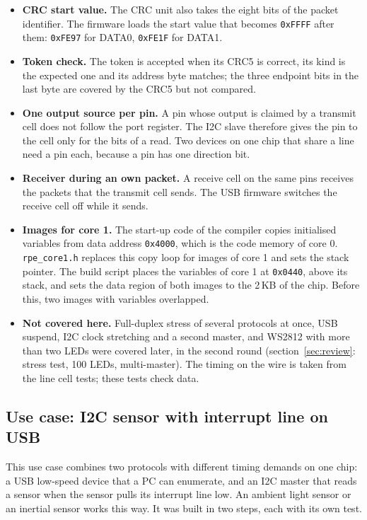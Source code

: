 \documentclass[10pt,a4paper]{article}
\begin{document}
\begin{itemize}
the code is fast enough.
\item \textbf{CRC start value.} The CRC unit also takes the eight bits of the packet identifier. The firmware loads
the start value that becomes \texttt{0xFFFF} after them: \texttt{0xFE97} for DATA0, \texttt{0xFE1F} for DATA1.
\item \textbf{Token check.} The token is accepted when its CRC5 is correct, its kind is the expected one and its address byte matches; the three endpoint bits in the last byte are covered by the CRC5 but not compared.
\item \textbf{One output source per pin.} A pin whose output is claimed by a transmit cell does not follow the port
register. The I2C slave therefore gives the pin to the cell only for the bits of a read. Two devices on one
chip that share a line need a pin each, because a pin has one direction bit.
\item \textbf{Receiver during an own packet.} A receive cell on the same pins receives the packets that the
transmit cell sends. The USB firmware switches the receive cell off while it sends.
\item \textbf{Images for core 1.} The start-up code of the compiler copies initialised variables from data address
\texttt{0x4000}, which is the code memory of core 0. \texttt{rpe\_core1.h} replaces this copy loop for images
of core 1 and sets the stack pointer. The build script places the variables of core 1 at \texttt{0x0440}, above
its stack, and sets the data region of both images to the 2\,KB of the chip. Before this, two images with
variables overlapped.
\item \textbf{Not covered here.} Full-duplex stress of several protocols at once, USB suspend, I2C clock
stretching and a second master, and WS2812 with more than two LEDs were covered later, in the second round
(section~\ref{sec:review}: stress test, 100 LEDs, multi-master). The timing on the wire is taken from the line
cell tests; these tests check data.
\end{itemize}

\subsection{Use case: I2C sensor with interrupt line on USB}\label{sec:sensver}

This use case combines two protocols with different timing demands on one chip: a USB low-speed device that a
PC can enumerate, and an I2C master that reads a sensor when the sensor pulls its interrupt line low. An
ambient light sensor or an inertial sensor works this way. It was built in two steps, each with its own test.
\end{document}
